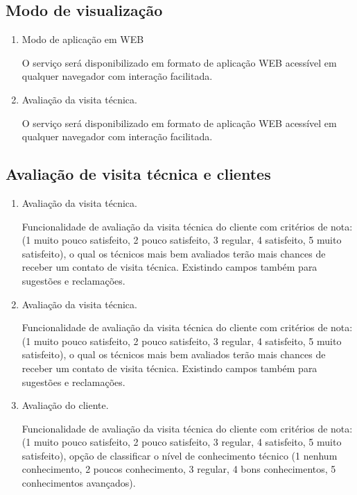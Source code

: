 \documentclass[
    12pt,               %
    openright,          %
    oneside,
    a4paper,            %
    MODELO,             %
    english,            %
    brazil              %
   ]{ifsp-spo-inf-ctds}
\begin{document}
\subsection{Modo de visualização}

	\begin{enumerate}
	
	\item Modo de aplicação em WEB
	
	O serviço será disponibilizado em formato de aplicação WEB acessível em qualquer navegador com interação facilitada.
	
	\item Avaliação da visita técnica.
	
	O serviço será disponibilizado em formato de aplicação WEB acessível em qualquer navegador com interação facilitada.
		
	\end{enumerate}

\subsection{Avaliação de visita técnica e clientes}

\begin{enumerate}
	
	\item Avaliação da visita técnica.
	
	Funcionalidade de avaliação da visita técnica do cliente com critérios de nota:(1 muito pouco satisfeito, 2 pouco satisfeito, 3 regular, 4 satisfeito, 5 muito satisfeito), o qual os técnicos mais bem avaliados terão mais chances de receber um contato de visita técnica. Existindo campos também para sugestões e reclamações.


	\item Avaliação da visita técnica.
	
	Funcionalidade de avaliação da visita técnica do cliente com critérios de nota:(1 muito pouco satisfeito, 2 pouco satisfeito, 3 regular, 4 satisfeito, 5 muito satisfeito), o qual os técnicos mais bem avaliados terão mais chances de receber um contato de visita técnica. Existindo campos também para sugestões e reclamações.

	\item Avaliação do cliente.
	
	Funcionalidade de avaliação da visita técnica do cliente com critérios de nota:(1 muito pouco satisfeito, 2 pouco satisfeito, 3 regular, 4 satisfeito, 5 muito satisfeito), opção de classificar o nível de conhecimento técnico (1 nenhum conhecimento, 2 poucos conhecimento, 3 regular, 4 bons conhecimentos, 5 conhecimentos avançados).

\end{enumerate}
\end{document}
